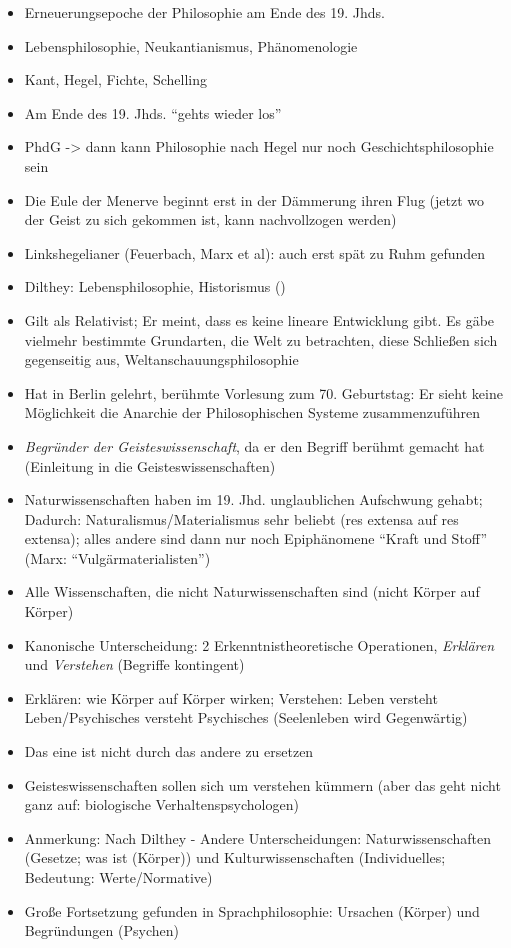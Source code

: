\documentclass[emulatestandardclasses]{scrartcl}
\begin{document}
\begin{itemize}
  \item Erneuerungsepoche der Philosophie am Ende des 19. Jhds.
  \item Lebensphilosophie, Neukantianismus, Phänomenologie
  \item Kant, Hegel, Fichte, Schelling
  \item Am Ende des 19. Jhds. "`gehts wieder los"'
  \item PhdG -> dann kann Philosophie nach Hegel nur noch Geschichtsphilosophie sein
  \item Die Eule der Menerve beginnt erst in der Dämmerung ihren Flug (jetzt wo der Geist zu sich gekommen ist, kann nachvollzogen werden)
  \item Linkshegelianer (Feuerbach, Marx et al): auch erst spät zu Ruhm gefunden
  \item Dilthey: Lebensphilosophie, Historismus ()
  \item Gilt als Relativist; Er meint, dass es keine lineare Entwicklung gibt. Es gäbe vielmehr bestimmte Grundarten, die Welt zu betrachten, diese Schließen sich gegenseitig aus, Weltanschauungsphilosophie
  \item Hat in Berlin gelehrt, berühmte Vorlesung zum 70. Geburtstag: Er sieht keine Möglichkeit die Anarchie der Philosophischen Systeme zusammenzuführen
  \item \emph{Begründer der Geisteswissenschaft}, da er den Begriff berühmt gemacht hat (Einleitung in die Geisteswissenschaften)
  \item Naturwissenschaften haben im 19. Jhd. unglaublichen Aufschwung gehabt; Dadurch: Naturalismus/Materialismus sehr beliebt (res extensa auf res extensa); alles andere sind dann nur noch Epiphänomene "`Kraft und Stoff"' (Marx: "`Vulgärmaterialisten"')
  \item Alle Wissenschaften, die nicht Naturwissenschaften sind (nicht Körper auf Körper)
  \item Kanonische Unterscheidung: 2 Erkenntnistheoretische Operationen, \emph{Erklären} und \emph{Verstehen} (Begriffe kontingent)
  \item Erklären: wie Körper auf Körper wirken; Verstehen: Leben versteht Leben/Psychisches versteht Psychisches (Seelenleben wird Gegenwärtig)
  \item Das eine ist nicht durch das andere zu ersetzen
  \item Geisteswissenschaften sollen sich um verstehen kümmern (aber das geht nicht ganz auf: biologische Verhaltenspsychologen)
  \item Anmerkung: Nach Dilthey - Andere Unterscheidungen: Naturwissenschaften (Gesetze; was ist (Körper)) und Kulturwissenschaften (Individuelles; Bedeutung: Werte/Normative)
  \item Große Fortsetzung gefunden in Sprachphilosophie: Ursachen (Körper) und Begründungen (Psychen)
\end{itemize}
\end{document}
